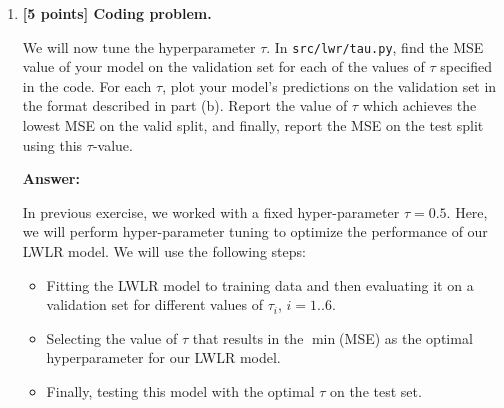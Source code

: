 \documentclass{article}
\begin{document}
\begin{enumerate}[label=\alph*)]
Does the model seem to be under- or overfitting?

\textbf{Answer:}

Here we trained LWLR model on provided dataset, and obtained mean squared error, MSE = $0.331$ (rounded to three decimal places). Below is given a plot ( please see Fig.~\ref{fig:wlr}) that shows training set in blue crosses, whereas red circles here illustrate predicted response variable, $y_{pred}$ at query/input points, $x$, from the validation set.
 \begin{figure}[H]
  \centering
  \includegraphics[width=0.7\textwidth]
  {WLR_outcome_plot.png}
  \caption{Illustration of LWLR  model performance, for fixed $\tau = 0.5$}
  \label{fig:wlr}
\end{figure} 
We can see that obtained model is not able to explain the underlying signal/trend, suggesting that current model is under-fitting; this indicates that our model's complexity/flexibility is insufficient (i.e. model is too simple) to properly capture the desired patterns.





\item \textbf{[5 points] Coding problem.}

We will now tune the hyperparameter $\tau$. In \texttt{src/lwr/tau.py}, find the MSE value of your model on the validation set for each of the values of $\tau$ specified in the code. For each $\tau$, plot your model's predictions on the validation set in the format described in part (b). Report the value of $\tau$ which achieves the lowest MSE on the valid split, and finally, report the MSE on the test split using this $\tau$-value.

\textbf{Answer:}

In previous exercise, we worked with a fixed hyper-parameter $\tau = 0.5$. Here, we will perform hyper-parameter tuning to optimize the performance of our LWLR model. We will use the following steps:
\begin{itemize}
    \item Fitting the LWLR model to training data and then evaluating it on a validation set for different values of $\tau_i$, $i=1..6$.
    \item Selecting the value of $\tau$ that results in the $\min$(MSE) as the optimal hyperparameter for our LWLR model.
    \item Finally, testing this model with the optimal $\tau$ on the test set.
\end{itemize}


\end{enumerate}
\end{document}
